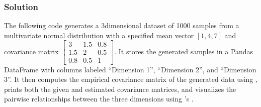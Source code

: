 \documentclass[letterpaper,10pt,english]{jupyterBook}
\begin{document}
\subsubsection{Solution}
\label{\detokenize{01:id12}}
\sphinxAtStartPar
The following code generates a 3\sphinxhyphen{}dimensional dataset of 1000 samples from a multivariate normal distribution with a specified mean vector \([1, 4, 7]\) and covariance matrix \(\begin{bmatrix} 3 & 1.5 & 0.8 \\ 1.5 & 2 & 0.5 \\ 0.8 & 0.5 & 1 \end{bmatrix}\). It stores the generated samples in a Pandas DataFrame with columns labeled “Dimension 1”, “Dimension 2”, and “Dimension 3”. It then computes the empirical covariance matrix of the generated data using , prints both the given and estimated covariance matrices, and visualizes the pairwise relationships between the three dimensions using ’s .
\end{document}
